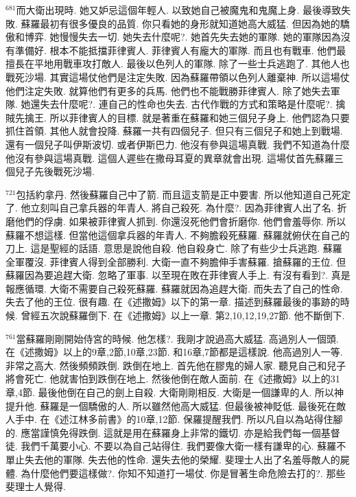 \documentclass{book}
\begin{document}
$^{681}$而大衛出現時.
她又妒忌這個年輕人.
以致她自己被魔鬼和鬼魔上身.
最後導致失敗.
蘇羅最初有很多優良的品質.
你只看她的身形就知道她高大威猛.
但因為她的驕傲和博弈.
她慢慢失去一切.
她失去什麼呢?.
她首先失去她的軍隊.
她的軍隊因為沒有準備好.
根本不能抵擋菲律賓人.
菲律賓人有龐大的軍隊.
而且也有戰車.
他們最擅長在平地用戰車攻打敵人.
最後以色列人的軍隊.
除了一些士兵逃跑了.
其他人也戰死沙場.
其實這場仗他們是注定失敗.
因為蘇羅帶領以色列人離棄神.
所以這場仗他們注定失敗.
就算他們有更多的兵馬.
他們也不能戰勝菲律賓人.
除了她失去軍隊.
她還失去什麼呢?.
連自己的性命也失去.
古代作戰的方式和策略是什麼呢?.
擒賊先擒王.
所以菲律賓人的目標.
就是著重在蘇羅和她三個兒子身上.
他們認為只要抓住首領.
其他人就會投降.
蘇羅一共有四個兒子.
但只有三個兒子和她上到戰場.
還有一個兒子叫伊斯波切.
或者伊斯巴力.
他沒有參與這場真戰.
我們不知道為什麼他沒有參與這場真戰.
這個人遲些在撒母耳夏的異章就會出現.
這場仗首先蘇羅三個兒子先後戰死沙場.

$^{721}$包括約拿丹.
然後蘇羅自己中了箭.
而且這支箭是正中要害.
所以他知道自己死定了.
他立刻叫自己拿兵器的年青人.
將自己殺死.
為什麼?.
因為菲律賓人出了名.
折磨他們的俘虜.
如果被菲律賓人抓到.
你還沒死他們會折磨你.
他們會羞辱你.
所以蘇羅不想這樣.
但當他這個拿兵器的年青人.
不夠膽殺死蘇羅.
蘇羅就俯伏在自己的刀上.
這是聖經的話語.
意思是說他自殺.
他自殺身亡.
除了有些少士兵逃跑.
蘇羅全軍覆沒.
菲律賓人得到全部勝利.
大衛一直不夠膽伸手害蘇羅.
搶蘇羅的王位.
但蘇羅因為要追趕大衛.
忽略了軍事.
以至現在敗在菲律賓人手上.
有沒有看到?.
真是報應循環.
大衛不需要自己殺死蘇羅.
蘇羅就因為追趕大衛.
而失去了自己的性命.
失去了他的王位.
很有趣.
在《述撒姆》以下的第一章.
描述到蘇羅最後的事跡的時候.
曾經五次說蘇羅倒下.
在《述撒姆》以上一章.
第2,10,12,19,27節.
他不斷倒下.

$^{761}$當蘇羅剛剛開始侍宮的時候.
他怎樣?.
我剛才說過高大威猛.
高過別人一個頭.
在《述撒姆》以上的9章,2節,10章,23節.
和16章,7節都是這樣說.
他高過別人一等.
非常之高大.
然後頻頻跌倒.
跌倒在地上.
首先他在膠鬼的婦人家.
聽見自己和兒子將會死亡.
他就害怕到跌倒在地上.
然後他倒在敵人面前.
在《述撒姆》以上的31章,4節.
最後他倒在自己的劍上自殺.
大衛剛剛相反.
大衛是一個謙卑的人.
所以神提升他.
蘇羅是一個驕傲的人.
所以雖然他高大威猛.
但最後被神貶低.
最後死在敵人手中.
在《述江林多前書》的10章,12節.
保羅提醒我們.
所以凡自以為站得住腳的.
應當謹慎免得跌倒.
這就是用在蘇羅身上非常的鐵切.
亦是給我們每一個基督徒.
我們千萬要小心.
不要以為自己站得住.
我們要像大衛一樣有謙卑的心.
蘇羅不單止失去他的軍隊.
失去他的性命.
還失去他的榮耀.
斐理士人出了名羞辱敵人的屍體.
為什麼他們要這樣做?.
你知不知道打一場仗.
你是冒著生命危險去打的?.
那些斐理士人覺得.
\end{document}
